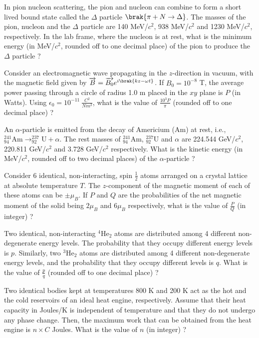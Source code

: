\item In pion nucleon scattering, the pion and nucleon can combine to form a short lived bound state called the $\Delta$ particle $\brak{\pi + N \rightarrow \Delta}$. The masses of the pion, nucleon and the $\Delta$ particle are 140 MeV/$c^2$, 938 MeV/$c^2$ and 1230 MeV/$c^2$, respectively. In the lab frame, where the nucleon is at rest, what is the minimum energy (in MeV/$c^2$, rounded off to one decimal place) of the pion to produce the
$\Delta$ particle ? \\
\item Consider an electromagnetic wave propagating in the $z$-direction in vacuum, with the magnetic field given by $\overrightarrow{B} = \overrightarrow{B_0}e^{i\brak{kz - \omega t}}$. If $B_0 = 10^{-8}$ T, the average power passing through a circle of radius 1.0 m placed in the $xy$ plane is $P$ (in Watts). Using $\epsilon_0 = 10^{-11}\ \frac{C^2}{N m^2}$, what is the value of $\frac{10^3P}{\pi}$ (rounded off to one decimal place) ? \\
\item An $\alpha$-particle is emitted from the decay of Americium (Am) at rest, i.e., $^{241}_{94}\text{Am} \rightarrow ^{237}_{92}\text{U} + \alpha$. The rest masses of $^{241}_{94}\text{Am}$, $^{237}_{92}\text{U}$ and $\alpha$ are 224.544 GeV/$c^2$, 220.811 GeV/$c^2$ and 3.728 GeV/$c^2$ respectively. What is the kinetic energy (in MeV/$c^2$, rounded off to two decimal places) of the $\alpha$-particle ? \\
\item Consider 6 identical, non-interacting, spin $\frac{1}{2}$ atoms arranged on a crystal lattice at absolute temperature $T$. The $z$-component of the magnetic moment of each of these atoms can be $\pm\mu_B$. If $P$ and $Q$ are the probabilities of the net magnetic moment of the solid being $2\mu_B$ and $6\mu_B$ respectively, what is the value of $\frac{P}{Q}$ (in integer) ? \\
\item Two identical, non-interacting $^4\text{He}_2$ atoms are distributed among 4 different non-degenerate energy levels. The probability that they occupy different energy levels is $p$. Similarly, two $^3\text{He}_2$ atoms are distributed among 4 different non-degenerate energy levels, and the probability that they occupy different levels is $q$. What is the value of $\frac{p}{q}$ (rounded off to one decimal place) ? \\
\item Two identical bodies kept at temperatures 800 K and 200 K act as the hot and the cold reservoirs of an ideal heat engine, respectively. Assume that their heat capacity  in Joules/K is independent of temperature and that they do not undergo any phase change. Then, the maximum work that can be obtained from the heat engine is $n \times C$ Joules. What is the value of $n$ (in integer) ? \\
